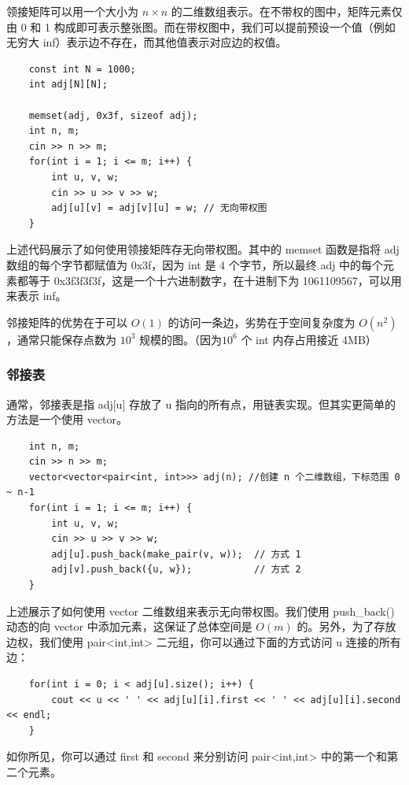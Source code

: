\documentclass[12pt,a4paper]{article}
\begin{document}
领接矩阵可以用一个大小为 $n\times n$ 的二维数组表示。在不带权的图中，矩阵元素仅由 0 和 1 构成即可表示整张图。而在带权图中，我们可以提前预设一个值（例如无穷大 inf）表示边不存在，而其他值表示对应边的权值。

\begin{lstlisting}
    const int N = 1000;
    int adj[N][N];
    
    memset(adj, 0x3f, sizeof adj); 
    int n, m;
    cin >> n >> m;
    for(int i = 1; i <= m; i++) {
        int u, v, w;
        cin >> u >> v >> w;
        adj[u][v] = adj[v][u] = w; // 无向带权图
    }
\end{lstlisting}

上述代码展示了如何使用领接矩阵存无向带权图。其中的 memset 函数是指将 adj 数组的每个字节都赋值为 0x3f，因为 int 是 4 个字节，所以最终 adj 中的每个元素都等于 0x3f3f3f3f，这是一个十六进制数字，在十进制下为 1061109567，可以用来表示 inf。

邻接矩阵的优势在于可以 $O(1)$ 的访问一条边，劣势在于空间复杂度为 $O(n^2)$，通常只能保存点数为 $10^3$ 规模的图。（因为$10^6$ 个 int 内存占用接近 4MB）

\subsubsection{邻接表}

通常，邻接表是指 adj[u] 存放了 u 指向的所有点，用链表实现。但其实更简单的方法是一个使用 vector。

\begin{lstlisting}
    int n, m;
    cin >> n >> m;
    vector<vector<pair<int, int>>> adj(n); //创建 n 个二维数组，下标范围 0 ~ n-1
    for(int i = 1; i <= m; i++) {
        int u, v, w;
        cin >> u >> v >> w;
        adj[u].push_back(make_pair(v, w));  // 方式 1
        adj[v].push_back({u, w});           // 方式 2
    }
\end{lstlisting}

上述展示了如何使用 vector 二维数组来表示无向带权图。我们使用 push\_back() 动态的向 vector 中添加元素，这保证了总体空间是 $O(m)$ 的。另外，为了存放边权，我们使用 pair<int,int> 二元组，你可以通过下面的方式访问 u 连接的所有边：

\begin{lstlisting}
    for(int i = 0; i < adj[u].size(); i++) {
        cout << u << ' ' << adj[u][i].first << ' ' << adj[u][i].second << endl;
    }
\end{lstlisting}

如你所见，你可以通过 first 和 second 来分别访问 pair<int,int> 中的第一个和第二个元素。
\end{document}
